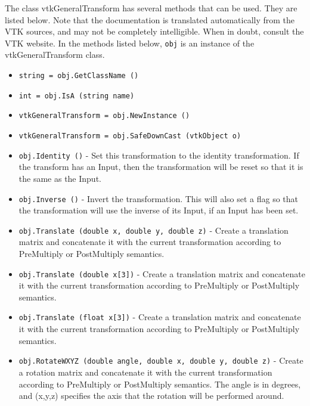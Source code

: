 The class vtkGeneralTransform has several methods that can be used.
  They are listed below.
Note that the documentation is translated automatically from the VTK sources,
and may not be completely intelligible.  When in doubt, consult the VTK website.
In the methods listed below, \verb|obj| is an instance of the vtkGeneralTransform class.
\begin{itemize}
\item  \verb|string = obj.GetClassName ()|

\item  \verb|int = obj.IsA (string name)|

\item  \verb|vtkGeneralTransform = obj.NewInstance ()|

\item  \verb|vtkGeneralTransform = obj.SafeDownCast (vtkObject o)|

\item  \verb|obj.Identity ()| -  Set this transformation to the identity transformation.  If 
 the transform has an Input, then the transformation will be
 reset so that it is the same as the Input.

\item  \verb|obj.Inverse ()| -  Invert the transformation.  This will also set a flag so that
 the transformation will use the inverse of its Input, if an Input
 has been set.

\item  \verb|obj.Translate (double x, double y, double z)| -  Create a translation matrix and concatenate it with the current
 transformation according to PreMultiply or PostMultiply semantics.

\item  \verb|obj.Translate (double x[3])| -  Create a translation matrix and concatenate it with the current
 transformation according to PreMultiply or PostMultiply semantics.

\item  \verb|obj.Translate (float x[3])| -  Create a translation matrix and concatenate it with the current
 transformation according to PreMultiply or PostMultiply semantics.

\item  \verb|obj.RotateWXYZ (double angle, double x, double y, double z)| -  Create a rotation matrix and concatenate it with the current
 transformation according to PreMultiply or PostMultiply semantics.
 The angle is in degrees, and (x,y,z) specifies the axis that the
 rotation will be performed around. 


\end{itemize}
